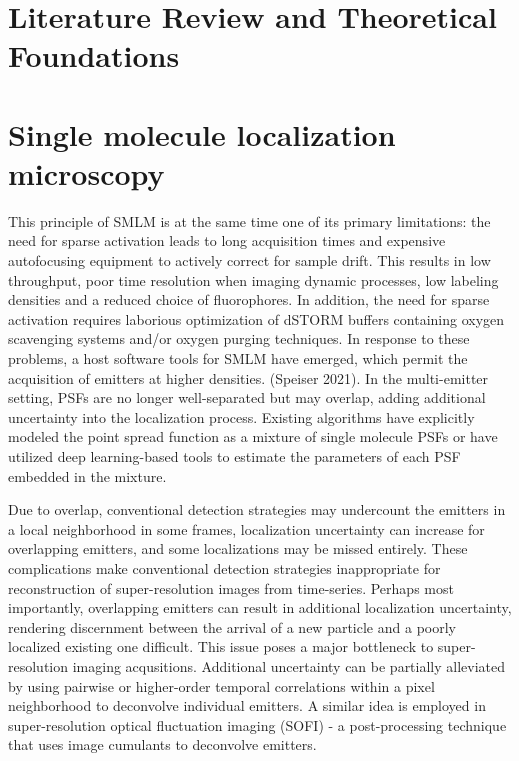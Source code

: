 \documentclass{ucetd}
\begin{document}
\clearpage

\mainmatter

\chapter{Literature Review and Theoretical Foundations}

\chapter{Single molecule localization microscopy}


This principle of SMLM is at the same time one of its primary limitations: the need for sparse activation leads to long acquisition times and expensive autofocusing equipment to actively correct for sample drift. This results in low throughput, poor time resolution when imaging dynamic processes, low labeling densities and a reduced choice of fluorophores. In addition, the need for sparse activation requires laborious optimization of dSTORM buffers containing oxygen scavenging systems and/or oxygen purging techniques. In response to these problems, a host software tools for SMLM have emerged, which permit the acquisition of emitters at higher densities. (Speiser 2021). In the multi-emitter setting, PSFs are no longer well-separated but may overlap, adding additional uncertainty into the localization process. Existing algorithms have explicitly modeled the point spread function as a mixture of single molecule PSFs or have utilized deep learning-based tools to estimate the parameters of each PSF embedded in the mixture.  

Due to overlap, conventional detection strategies may undercount the emitters in a local neighborhood in some frames, localization uncertainty can increase for overlapping emitters, and some localizations may be missed entirely. These complications make conventional detection strategies inappropriate for reconstruction of super-resolution images from time-series. Perhaps most importantly, overlapping emitters can result in additional localization uncertainty, rendering discernment between the arrival of a new particle and a poorly localized existing one difficult. This issue poses a major bottleneck to super-resolution imaging acqusitions. Additional uncertainty can be partially alleviated by using pairwise or higher-order temporal correlations within a pixel neighborhood to deconvolve individual emitters. A similar idea is employed in super-resolution optical fluctuation imaging (SOFI) - a post-processing technique that uses image cumulants to deconvolve emitters. 
\end{document}

